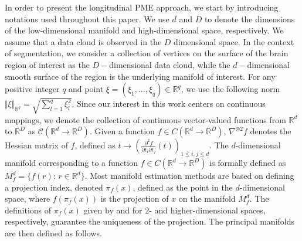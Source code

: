 \documentclass[11pt,reqno]{article}
\theoremstyle{definition}
\begin{document}
In order to present the longitudinal PME approach, we start by introducing notations used throughout this paper. We use $d$ and $D$ to denote the dimensions of the low-dimensional manifold and high-dimensional space, respectively. We assume that a data cloud is observed in the $D$ dimensional space. In the context of segmentation, we consider a collection of vertices on the surface of the brain region of interest as the $D-$dimensional data cloud, while the $d-$dimensional smooth surface of the region is the underlying manifold of interest. For any positive integer $q$ and point $\xi=(\xi_1,\ldots,\xi_q)\in\mathbb{R}^q$, we use the following norm $\Vert \xi\Vert_{\mathbb{R}^q}=\sqrt{\sum_{l=1}^q \xi_l^2}$. Since our interest in this work centers on continuous mappings, we denote the collection of continuous vector-valued functions from $\mathbb{R}^d$ to $\mathbb{R}^D$ as $\mathcal{C}(\mathbb{R}^{d} \to \mathbb{R}^{D})$. Given a function $f \in C(\mathbb{R}^{d} \to \mathbb{R}^{D})$, $\nabla^{\otimes 2} f$ denotes the Hessian matrix of $f$, defined as $t \to \left( \frac{\partial ^2 f}{\partial t_i \partial t_j}(t) \right)_{1 \leq i, j \leq d}$. The $d$-dimensional manifold corresponding to a function $f \in C(\mathbb{R}^{d} \to \mathbb{R}^{D})$ is formally defined as $M_f^d=\{f(r):\,r\in\mathbb{R}^d\}$. Most manifold estimation methods are based on defining a projection index, denoted $\pi_f(x)$, defined as the point in the $d$-dimensional space, where $f(\pi_f(x))$ is the projection of $x$ on the manifold $M_f^d$. The definitions of $\pi_f(x)$ given by \cite{hastiePrincipalCurves1989} and \cite{mengPrincipalManifoldEstimation2021} for $2$- and higher-dimensional spaces, respectively, guarantee the uniqueness of the projection. The principal manifolds are then defined as follows.
\end{document}
